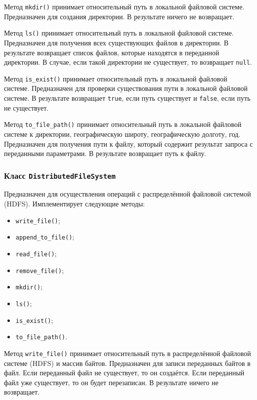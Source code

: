 Метод \texttt{mkdir()} принимает относительный путь в локальной файловой системе.
Предназначен для создания директории. 
В результате ничего не возвращает.

Метод \texttt{ls()} принимает относительный путь в локальной файловой системе.
Предназначен для получения всех существующих файлов в директории.
В результате возвращает список файлов, которые находятся в переданной директории.
В случае, если такой директории не существует, то возвращает \texttt{null}.

Метод \texttt{is\_exist()} принимает относительный путь в локальной файловой системе.
Предназначен для проверки существования пути в локальной файловой системе.
В результате возвращает \texttt{true}, если путь существует и \texttt{false}, если путь не существует.

Метод \texttt{to\_file\_path()} принимает относительный путь в локальной файловой системе к директории, географическую широту, географическую долготу, год.
Предназначен для получения пути к файлу, который содержит результат запроса с переданными параметрами.
В результате возвращает путь к файлу.


\subsubsection{Класс \texttt{DistributedFileSystem}}
Предназначен для осуществления операций с распределённой файловой системой (HDFS).
Имплементирует следующие методы:
\begin{itemize}
    \item \texttt{write\_file()};
    \item \texttt{append\_to\_file()};
    \item \texttt{read\_file()};
    \item \texttt{remove\_file()};
    \item \texttt{mkdir()};
    \item \texttt{ls()};
    \item \texttt{is\_exist()};
    \item \texttt{to\_file\_path()}.
\end{itemize}

Метод \texttt{write\_file()} принимает относительный путь в распределённой файловой системе (HDFS) и массив байтов.
Предназначен для записи переданных байтов в файл.
Если переданный файл не существует, то он создаётся.
Если переданный файл уже существует, то он будет перезаписан.
В результате ничего не возвращает.

